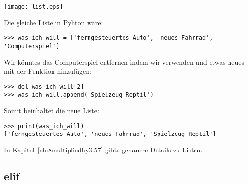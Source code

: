 \begin{center}
\texttt{[image: list.eps]}
\end{center}

\noindent
Die gleiche Liste in Pyhton wäre:

\begin{Verbatim}[frame=single]
>>> was_ich_will = ['ferngesteuertes Auto', 'neues Fahrrad', 'Computerspiel']
\end{Verbatim}

\noindent
Wir könntes das Computerspiel entfernen indem wir  verwenden und etwas neues mit der Funktion  hinzufügen:

\begin{Verbatim}[frame=single]
>>> del was_ich_will[2]
>>> was_ich_will.append('Spielzeug-Reptil')
\end{Verbatim}

\noindent
Somit beinhaltet die neue Liste:

\begin{Verbatim}[frame=single]
>>> print(was_ich_will)
['ferngesteuertes Auto', 'neues Fahrrad', 'Spielzeug-Reptil']
\end{Verbatim}

\noindent
In Kapitel~\ref{ch:8multipliedby3.57} gibts genauere Details zu Listen.

\subsection*{elif}

